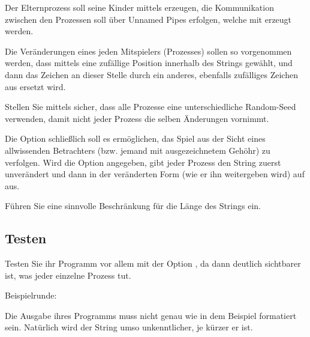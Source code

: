 Der Elternprozess soll seine Kinder mittels 
erzeugen, die Kommunikation zwischen den Prozessen soll über Unnamed
Pipes erfolgen, welche mit  erzeugt werden.

Die Veränderungen eines jeden Mitspielers (Prozesses) sollen so
vorgenommen werden, dass mittels  eine zufällige
Position innerhalb des Strings gewählt, und dann das Zeichen an
dieser Stelle durch ein anderes, ebenfalls zufälliges Zeichen aus
\osueregex{[a-zA-Z]} ersetzt wird.

Stellen Sie mittels  sicher, dass alle Prozesse eine
unterschiedliche Random-Seed verwenden, damit nicht jeder Prozess die
selben Änderungen vornimmt.

Die Option  schließlich soll es ermöglichen, das Spiel aus
der Sicht eines allwissenden Betrachters (bzw. jemand mit ausgezeichnetem Geh{\"o}hr)
zu verfolgen. Wird die Option
angegeben, gibt jeder Prozess den String zuerst unverändert und dann
in der veränderten Form (wie er ihn weitergeben wird) auf
 aus.

Führen Sie eine sinnvolle Beschränkung für die Länge des Strings
ein.

\subsection*{Testen}

Testen Sie ihr Programm vor allem mit der Option , da dann
deutlich sichtbarer ist, was jeder einzelne Prozess tut.

Beispielrunde:


Die Ausgabe ihres Programms muss nicht genau wie in dem Beispiel
formatiert sein. Natürlich wird der String umso unkenntlicher, je
kürzer er ist.

\osueguidelinestwo


